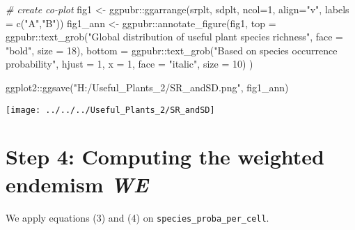 \documentclass[
]{article}
\newenvironment{Shaded}{\begin{snugshade}}{\end{snugshade}}
\newcommand{\AttributeTok}[1]{\textcolor[rgb]{0.77,0.63,0.00}{#1}}
\newcommand{\CommentTok}[1]{\textcolor[rgb]{0.56,0.35,0.01}{\textit{#1}}}
\newcommand{\DecValTok}[1]{\textcolor[rgb]{0.00,0.00,0.81}{#1}}
\newcommand{\FunctionTok}[1]{\textcolor[rgb]{0.00,0.00,0.00}{#1}}
\newcommand{\NormalTok}[1]{#1}
\newcommand{\OtherTok}[1]{\textcolor[rgb]{0.56,0.35,0.01}{#1}}
\newcommand{\SpecialCharTok}[1]{\textcolor[rgb]{0.00,0.00,0.00}{#1}}
\newcommand{\StringTok}[1]{\textcolor[rgb]{0.31,0.60,0.02}{#1}}
\begin{document}
\begin{Shaded}
\begin{Highlighting}[]
\CommentTok{\# create co{-}plot}
\NormalTok{fig1 }\OtherTok{\textless{}{-}}\NormalTok{ ggpubr}\SpecialCharTok{::}\FunctionTok{ggarrange}\NormalTok{(srplt,}
\NormalTok{                          sdplt,}
                          \AttributeTok{ncol=}\DecValTok{1}\NormalTok{,}
                          \AttributeTok{align=}\StringTok{"v"}\NormalTok{,}
                          \AttributeTok{labels =} \FunctionTok{c}\NormalTok{(}\StringTok{"A"}\NormalTok{,}\StringTok{"B"}\NormalTok{))}
\NormalTok{fig1\_ann }\OtherTok{\textless{}{-}}\NormalTok{ ggpubr}\SpecialCharTok{::}\FunctionTok{annotate\_figure}\NormalTok{(fig1,}
               \AttributeTok{top =}\NormalTok{ ggpubr}\SpecialCharTok{::}\FunctionTok{text\_grob}\NormalTok{(}\StringTok{"Global distribution of useful plant species richness"}\NormalTok{,}
                                     \AttributeTok{face =} \StringTok{"bold"}\NormalTok{, }\AttributeTok{size =} \DecValTok{18}\NormalTok{),}
               \AttributeTok{bottom =}\NormalTok{ ggpubr}\SpecialCharTok{::}\FunctionTok{text\_grob}\NormalTok{(}\StringTok{"Based on species occurrence probability"}\NormalTok{,}
                                  \AttributeTok{hjust =} \DecValTok{1}\NormalTok{, }\AttributeTok{x =} \DecValTok{1}\NormalTok{, }\AttributeTok{face =} \StringTok{"italic"}\NormalTok{, }\AttributeTok{size =} \DecValTok{10}\NormalTok{)}
\NormalTok{)}

\NormalTok{ggplot2}\SpecialCharTok{::}\FunctionTok{ggsave}\NormalTok{(}\StringTok{"H:/Useful\_Plants\_2/SR\_andSD.png"}\NormalTok{, fig1\_ann)}
\end{Highlighting}
\end{Shaded}

\begin{center}\texttt{[image: ../../../Useful\_Plants\_2/SR\_andSD]} \end{center}

\hypertarget{step-4-computing-the-weighted-endemism-we}{%
\section{\texorpdfstring{Step 4: Computing the weighted endemism
\emph{WE}}{Step 4: Computing the weighted endemism WE}}\label{step-4-computing-the-weighted-endemism-we}}

We apply equations (3) and (4) on \texttt{species\_proba\_per\_cell}.
\end{document}
